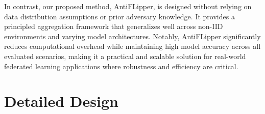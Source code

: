 \documentclass[conference]{IEEEtran}
\begin{document}
In contrast, our proposed method, AntiFLipper, is designed without relying on data distribution assumptions or prior adversary knowledge. It provides a principled aggregation framework that generalizes well across non-IID environments and varying model architectures. Notably, AntiFLipper significantly reduces computational overhead while maintaining high model accuracy across all evaluated scenarios, making it a practical and scalable solution for real-world federated learning applications where robustness and efficiency are critical.


\section{Detailed Design}
\label{sec:methodology}

\end{document}
